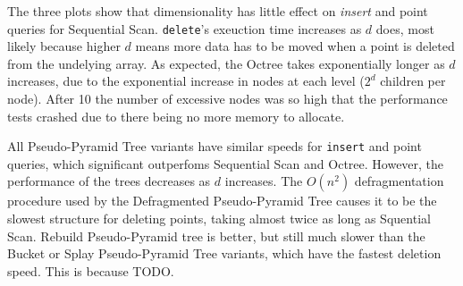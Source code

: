 The three plots show that dimensionality has little effect on \textit{insert} and point queries for Sequential Scan. \texttt{delete}'s exeuction time increases as $d$ does, most likely because higher $d$ means more data has to be moved when a point is deleted from the undelying array. As expected, the Octree takes exponentially longer as $d$ increases, due to the exponential increase in nodes at each level ($2^d$ children per node). After 10 the number of excessive nodes was so high that the performance tests crashed due to there being no more memory to allocate.

All Pseudo-Pyramid Tree variants have similar speeds for \texttt{insert} and point queries, which significant outperfoms Sequential Scan and Octree. However, the performance of the trees decreases as $d$ increases. The $O(n^2)$ defragmentation procedure used by the Defragmented Pseudo-Pyramid Tree causes it to be the slowest structure for deleting points, taking almost twice as long as Squential Scan. Rebuild Pseudo-Pyramid tree is better, but still much slower than the Bucket or Splay Pseudo-Pyramid Tree variants, which have the fastest deletion speed. This is because TODO.

